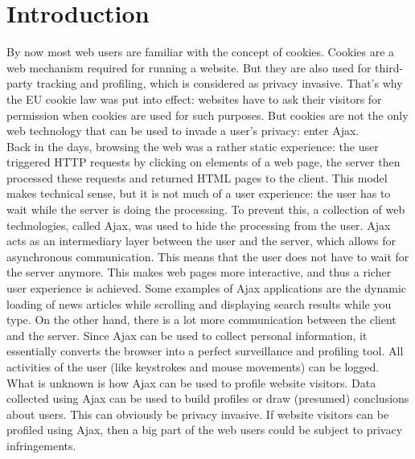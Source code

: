 \section{Introduction}
	
By now most web users are familiar with the concept of cookies. Cookies are a web mechanism required for running a website. But they are also used for third-party tracking and profiling, which is considered as privacy invasive. That's why the EU cookie law was put into effect: websites have to ask their visitors for permission when cookies are used for such purposes. But cookies are not the only web technology that can be used to invade a user's privacy: enter Ajax.\\
	
Back in the days, browsing the web was a rather static experience: the user triggered HTTP requests by clicking on elements of a web page, the server then processed these requests and returned HTML pages to the client. This model makes technical sense, but it is not much of a user experience: the user has to wait while the server is doing the processing. To prevent this, a collection of web technologies, called Ajax, was used to hide the processing from the user. Ajax acts as an intermediary layer between the user and the server, which allows for asynchronous communication. This means that the user does not have to wait for the server anymore. This makes web pages more interactive, and thus a richer user experience is achieved. Some examples of Ajax applications are the dynamic loading of news articles while scrolling and displaying search results while you type.	On the other hand, there is a lot more communication between the client and the server. Since Ajax can be used to collect personal information, it essentially converts the browser into a perfect surveillance and profiling tool. All activities of the user (like keystrokes and mouse movements) can be logged.\\
	
What is unknown is how Ajax can be used to profile website visitors. Data collected using Ajax can be used to build profiles or draw (presumed) conclusions about users. This can obviously be privacy invasive. If website visitors can be profiled using Ajax, then a big part of the web users could be subject to privacy infringements.\\	
	
